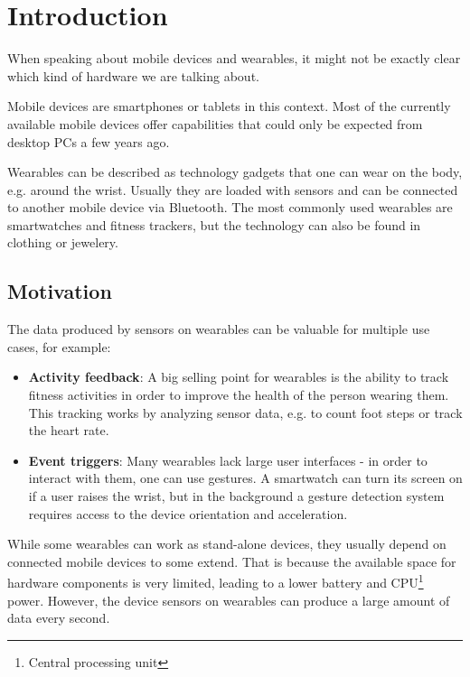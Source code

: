 \section{Introduction}
\label{sec:intro}

When speaking about mobile devices and wearables, it might not be exactly clear which kind of hardware we are talking about.

Mobile devices are smartphones or tablets in this context. Most of the currently available mobile devices offer capabilities that could only be expected from desktop PCs a few years ago.

Wearables can be described as technology gadgets that one can wear on the body, e.g. around the wrist.
Usually they are loaded with sensors and can be connected to another mobile device via Bluetooth.
The most commonly used wearables are smartwatches and fitness trackers, but the technology can also be found in clothing or jewelery.

\subsection{Motivation}
\label{sec:intro:motivation}

The data produced by sensors on wearables can be valuable for multiple use cases, for example:
\begin{itemize}[noitemsep]
	\item \textbf{Activity feedback}:
	A big selling point for wearables is the ability to track fitness activities in order to improve the health of the person wearing them.
	This tracking works by analyzing sensor data, e.g. to count foot steps or track the heart rate.
	\item \textbf{Event triggers}:
	Many wearables lack large user interfaces - in order to interact with them, one can use gestures.
	A smartwatch can turn its screen on if a user raises the wrist, but in the background a gesture detection system requires access to the device orientation and acceleration.
\end{itemize}

While some wearables can work as stand-alone devices, they usually depend on connected mobile devices to some extend.
That is because the available space for hardware components is very limited, leading to a lower battery and CPU\footnote{Central processing unit} power.
However, the device sensors on wearables can produce a large amount of data every second.

\clearpage

